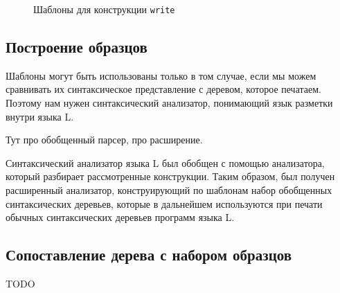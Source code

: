 \begin{figure}[h]
	\begin{subfigure}[h]{0.45\textwidth}
		
		\caption{}
		\label{fig:writeTmplt1}
	\end{subfigure}
	\begin{subfigure}[h]{0.45\textwidth}
		
		\caption{}
		\label{fig:writeTmplt2}
	\end{subfigure}
	\caption{Шаблоны для конструкции \lstinline{write}}
\end{figure}

\subsection{Построение образцов}

Шаблоны могут быть использованы только в том случае, если мы можем сравнивать их синтаксическое представление с деревом, которое печатаем. Поэтому нам нужен синтаксический анализатор, понимающий язык разметки внутри языка L.

% 	

% 	

Тут про обобщенный парсер, про расширение.

Синтаксический анализатор языка L был обобщен с помощью анализатора, который разбирает рассмотренные конструкции. Таким образом, был получен расширенный анализатор, конструирующий по шаблонам набор обобщенных синтаксических деревьев, которые в дальнейшем используются при печати обычных синтаксических деревьев программ языка L.

\subsection{Сопоставление дерева с набором образцов}

TODO


